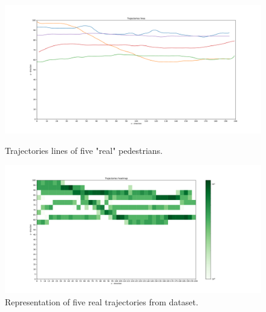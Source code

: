 \documentclass[class=article, crop=false]{standalone}
\begin{document}
\begin{figure}[ht]
\begin{minipage}[c]{0.5\linewidth}
\centering

\includegraphics[scale=0.17]{fig/5pids/figure_trainf10_few_trajectories_Dx200_Dy100_TRJLINES}

\captionsetup{width=.8\linewidth}
\caption{Trajectories lines of five "real" pedestrians.}
\label{fig:5pids_trjlines}
\end{minipage}
\begin{minipage}[c]{0.5\linewidth}
\centering

\includegraphics[scale=0.17]{fig/5pids/figure_trainf10_few_trajectories_Dx200_Dy100_TRJHIST}

\captionsetup{width=.8\linewidth}
\caption{Representation of five real trajectories from dataset.}
\label{fig:5pids_trjl}
\end{minipage}
\end{figure}
\end{document}
